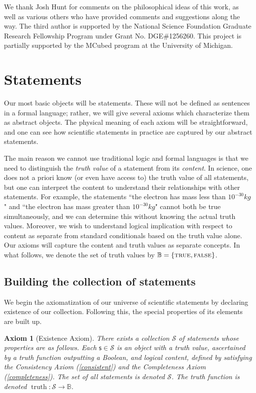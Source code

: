 \documentclass[psamsfonts]{amsart}
\newtheorem{axiom}[thm]{Axiom}
\theoremstyle{definition}
\theoremstyle{remark}
\numberwithin{equation}{section}
\DeclareMathOperator{\truth}{truth}
\def\TRUE{\textsc{true}}
\def\FALSE{\textsc{false}}
\newcommand{\stmt}[1][s] {\mathsf{#1}}
\begin{document}
 We thank Josh Hunt for comments on the philosophical ideas of this work, as well as various others who have provided comments and suggestions along the way. The third author is supported by the National Science Foundation Graduate Research Fellowship Program under Grant No. DGE\#1256260. This project is partially supported by the MCubed program at the University of Michigan. 


\section{Statements}
\label{statements}

Our most basic objects will be statements. These will not be defined as sentences in a formal language; rather, we will give several axioms which characterize them as abstract objects. The physical meaning of each axiom will be straightforward, and one can see how scientific statements in practice are captured by our abstract statements.

The main reason we cannot use traditional logic and formal languages is that we need to distinguish the \emph{truth value} of a statement from its \emph{content}. In science, one does not a priori know (or even have access to) the truth value of all statements, but one can interpret the content to understand their relationships with other statements. For example, the statements ``the electron has mass less than $10^{-30}kg$" and ``the electron has mass greater than $10^{-30}kg$" cannot both be true simultaneously, and we can determine this without knowing the actual truth values. Moreover, we wish to understand logical implication with respect to content as separate from standard conditionals based on the truth value alone. Our axioms will capture the content and truth values as separate concepts. In what follows, we denote the set of truth values by $\mathbb{B} = \{\TRUE,\FALSE\}$. 

\subsection{Building the collection of statements}

We begin the axiomatization of our universe of scientific statements by declaring existence of our collection. Following this, the special properties of its elements are built up. 

\begin{axiom}[Existence Axiom]
There exists a collection $\mathcal{S}$ of \emph{statements} whose properties are as follows. Each $\stmt\in\mathcal{S}$ is an object with a truth value, ascertained by a truth function outputting a Boolean, and logical content, defined by satisfying the Consistency Axiom (\ref{consistent}) and the Completeness Axiom (\ref{completeness}). The set of all statements is denoted $\mathcal{S}$. The truth function is denoted $\truth:\mathcal{S}\to\mathbb{B}$.
\end{axiom}
\end{document}

